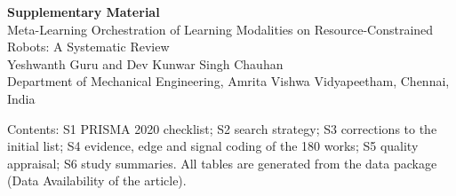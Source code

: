 \documentclass[10pt,a4paper]{article}
\begin{document}
\begin{center}
{\Large\bfseries Supplementary Material}\\[4pt]
{\large Meta-Learning Orchestration of Learning Modalities on Resource-Constrained Robots: A Systematic Review}\\[4pt]
Yeshwanth Guru and Dev Kunwar Singh Chauhan\\
Department of Mechanical Engineering, Amrita Vishwa Vidyapeetham, Chennai, India
\end{center}

\noindent Contents: S1 PRISMA 2020 checklist; S2 search strategy; S3 corrections to the initial list; S4 evidence, edge and signal coding of the 180 works; S5 quality appraisal; S6 study summaries. All tables are generated from the data package (Data Availability of the article).
\end{document}

